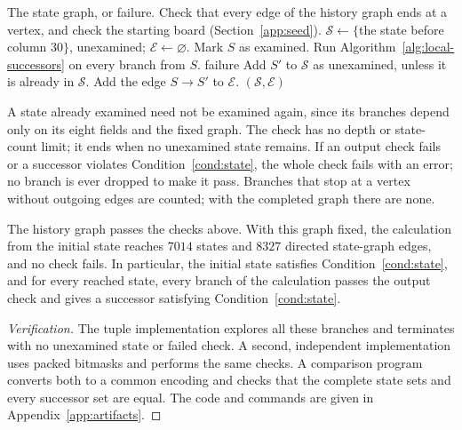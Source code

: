 \begin{algorithm}[H]
\caption{The exhaustive check}
\label{alg:check}
\renewcommand{\algorithmicensure}{\textbf{Output:}}
\begin{algorithmic}[1]
\Ensure The state graph, or failure.
\State Check that every edge of the history graph ends at a vertex, and check the starting board (Section~\ref{app:seed}).
\State $\mathcal S\gets\{$the state before column $30\}$, unexamined; $\mathcal E\gets\varnothing$.
  \State Mark $S$ as examined.
  \State Run Algorithm~\ref{alg:local-successors} on every branch from $S$.
      \State \Return failure
    \EndIf
    \State Add $S'$ to $\mathcal S$ as unexamined, unless it is already in $\mathcal S$.
    \State Add the edge $S\to S'$ to $\mathcal E$.
  \EndFor
\EndWhile
\State \Return $(\mathcal S,\mathcal E)$
\end{algorithmic}
\end{algorithm}

A state already examined need not be examined again, since its
branches depend only on its eight fields and the fixed graph. The
check has no depth or state-count limit; it ends when no unexamined
state remains. If an output check fails or a successor violates
Condition~\ref{cond:state}, the whole check fails with an error; no
branch is ever dropped to make it pass. Branches that stop at a
vertex without outgoing edges are counted; with the completed graph
there are none.

\begin{proposition}\label{lem:computation}
The history graph passes the checks above. With this graph fixed,
the calculation from the initial state reaches $7014$ states and
$8327$ directed state-graph edges, and no check fails. In
particular, the initial state satisfies Condition~\ref{cond:state},
and for every reached state, every branch of the calculation passes
the output check and gives a successor satisfying
Condition~\ref{cond:state}.
\end{proposition}
\begin{proof}[Verification]
The tuple implementation explores all these branches and terminates
with no unexamined state or failed check. A second, independent
implementation uses packed bitmasks and performs the same checks. A
comparison program converts both to a common encoding and checks
that the complete state sets and every successor set are equal. The
code and commands are given in Appendix~\ref{app:artifacts}.
\end{proof}

